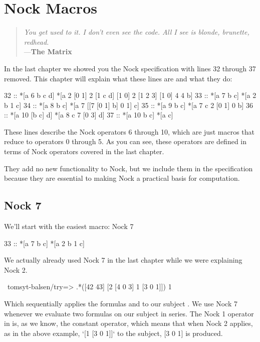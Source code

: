 \chapter{Nock Macros}

\label{cha:nock_macros}

\begin{quote}
\noindent \emph{You get used to it. I don't even see the code.
All I see is blonde, brunette, redhead.}
\medskip \\
---\textbf{The Matrix}
\end{quote}

In the last chapter we showed you the Nock specification with lines 32 through 37 removed.
This chapter will explain what these lines are and what they do:

\begin{code}
32 ::    *[a 6 b c d]     *[a 2 [0 1] 2 [1 c d] [1 0] 2 [1 2 3] [1 0] 4 4 b]
33 ::    *[a 7 b c]       *[a 2 b 1 c]
34 ::    *[a 8 b c]       *[a 7 [[7 [0 1] b] 0 1] c]
35 ::    *[a 9 b c]       *[a 7 c 2 [0 1] 0 b]
36 ::    *[a 10 [b c] d]  *[a 8 c 7 [0 3] d]
37 ::    *[a 10 b c]      *[a c]
\end{code}

These lines describe the Nock operators 6 through 10, which are just macros that reduce to operators 0 through 5. As you can see, these operators are defined in terms of Nock operators covered in the last chapter.

They add no new functionality to Nock, but we include them in the specification because they are essential to making Nock a practical basis for computation.

\section{Nock 7}

We'll start with the easiest macro: Nock 7

\begin{code}
33 ::    *[a 7 b c]       *[a 2 b 1 c]
\end{code}
We actually already used Nock 7 in the last chapter while we were explaining Nock 2.

\begin{code}
~tomsyt-balsen/try=> .*([42 43] [2 [4 0 3] 1 [3 0 1]])
1
\end{code}
Which sequentially applies the formulas \kode{[4 0 3]} and \kode{[3 0 1]} to our subject \kode{[42 43]}. We use Nock 7 whenever we evaluate two formulas on our subject in series. The Nock 1 operator in \kode{*[a 2 b 1 c]} is, as we know, the constant operator, which means that when Nock 2 applies, as in the above example, `[1 [3 0 1]]` to the subject, [3 0 1] is produced.

